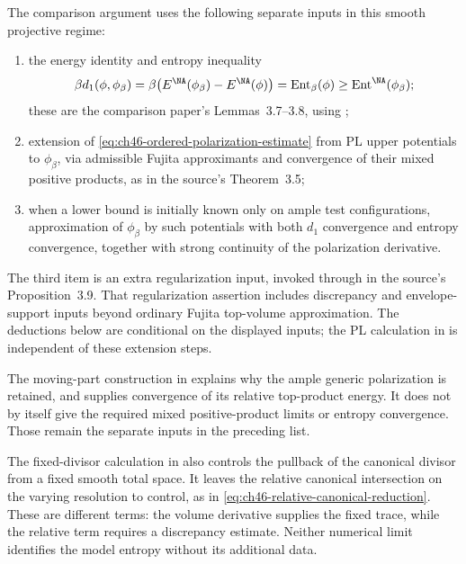 The comparison argument uses the following separate inputs in this
smooth projective regime:
\begin{enumerate}
\item the energy identity and entropy inequality
\[
 \beta d_1(\phi,\phi_\beta)
   =\beta\bigl(E^{\NA}(\phi_\beta)-E^{\NA}(\phi)\bigr)
   =\operatorname{Ent}_\beta(\phi)
   \geq\operatorname{Ent}^{\NA}(\phi_\beta);
\]
these are the comparison paper's Lemmas~3.7--3.8, using
\cite[Proposition~9.4 and Corollary~9.6]{DarvasZhang25YTD};
\item extension of
\eqref{eq:ch46-ordered-polarization-estimate} from PL upper potentials
to $\phi_\beta$, via admissible Fujita approximants and convergence
of their mixed positive products, as in the source's Theorem~3.5;
\item when a lower bound is initially known only on ample test
configurations, approximation of $\phi_\beta$ by such potentials
with both $d_1$ convergence and entropy convergence, together with
strong continuity of the polarization derivative.
\end{enumerate}
The third item is an extra regularization input, invoked through
\cite[Corollary~A]{Trusiani26} in the source's Proposition~3.9.
That regularization assertion includes discrepancy and envelope-support
inputs beyond ordinary Fujita top-volume approximation.
The deductions below are conditional on the displayed inputs;
the PL calculation in 
is independent of these extension steps.

The moving-part construction in
 explains why the ample
generic polarization is retained, and supplies convergence of its
relative top-product energy. It does not by itself give the required
mixed positive-product limits or entropy convergence. Those remain
the separate inputs in the preceding list.

The fixed-divisor calculation in 
also controls the pullback of the canonical divisor from a fixed
smooth total space. It leaves the relative canonical intersection
on the varying resolution to control, as in
\eqref{eq:ch46-relative-canonical-reduction}. These are different
terms: the volume derivative supplies the fixed trace, while the
relative term requires a discrepancy estimate. Neither numerical
limit identifies the model entropy without its additional data.

